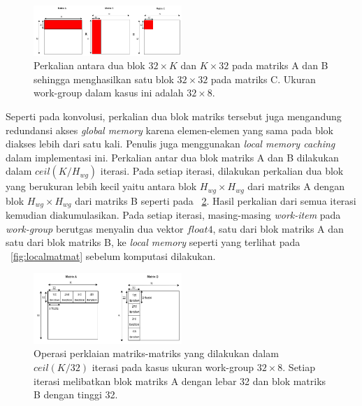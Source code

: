 \begin{figure}
	\centering
	\includegraphics[width=0.50\textwidth]
	{pics/blockmatmat.png}
	\caption{Perkalian antara dua blok $32 \times K$ dan $K \times 32$ pada matriks A dan B sehingga menghasilkan satu blok $32 \times 32$ pada matriks C. Ukuran work-group dalam kasus ini adalah $32 \times 8$.}
	\label{fig:blockmatmat}
\end{figure}

Seperti pada konvolusi, perkalian dua blok matriks tersebut juga mengandung redundansi akses \textit{global memory} karena elemen-elemen yang sama pada blok diakses lebih dari satu kali. Penulis juga menggunakan \textit{local memory caching} dalam implementasi ini. Perkalian antar dua blok matriks A dan B dilakukan dalam $ceil(K/H_{wg})$ iterasi. Pada setiap iterasi, dilakukan perkalian dua blok yang berukuran lebih kecil yaitu antara blok $H_{wg} \times H_{wg}$ dari matriks A dengan blok $H_{wg} \times H_{wg}$ dari matriks B seperti pada \pic~\ref{fig:matmatiter}. Hasil perkalian dari semua iterasi kemudian diakumulasikan. Pada setiap iterasi, masing-masing \textit{work-item} pada \textit{work-group} berutgas menyalin dua vektor $float4$, satu dari blok matriks A dan satu dari blok matriks B, ke \textit{local memory} seperti yang terlihat pada \pic~\ref{fig:localmatmat} sebelum komputasi dilakukan.

\begin{figure}
	\centering
	\includegraphics[width=0.50\textwidth]
	{pics/matmatiter.png}
	\caption{Operasi perklaian matriks-matriks yang dilakukan dalam $ceil(K/32)$ iterasi pada kasus ukuran work-group $32 \times 8$. Setiap iterasi melibatkan blok matriks A dengan lebar 32 dan blok matriks B dengan tinggi 32.}
	\label{fig:matmatiter}
\end{figure}

